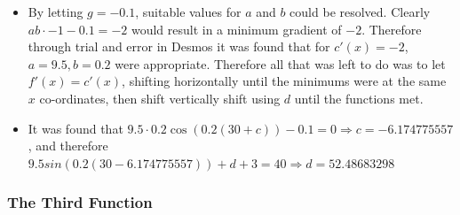 \documentclass[11pt, letterpaper]{article}
\begin{document}
\begin{itemize}
	\item By letting $g=-0.1$, suitable values for $a$ and $b$ could be resolved. Clearly $ab\cdot -1-0.1=-2$ would result in a minimum gradient of $-2$. Therefore through trial and error in Desmos it was found that for $c'(x)=-2$, $a=9.5,b=0.2$ were appropriate. Therefore all that was left to do was to let $f'(x)=c'(x)$, shifting horizontally until the minimums were at the same $x$ co-ordinates, then shift vertically shift using $d$ until the functions met.  
	\item It was found  that $9.5\cdot0.2\cos (0.2(30+c))-0.1=0 \Rightarrow c=-6.174775557$, and therefore $9.5sin(0.2(30-6.174775557))+d+3=40 \Rightarrow d=52.48683298$
\end{itemize}
\subsubsection{The Third Function}
\end{document}
